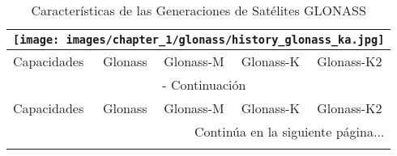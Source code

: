 \begin{center}
    \begin{longtable}{|p{3cm}|c|c|c|c|}
        \caption{Características de las Generaciones de Satélites GLONASS} \label{tab:glonass_satellites} \\
        \hline
        \multicolumn{5}{|c|}{
            \texttt{[image: images/chapter\_1/glonass/history\_glonass\_ka.jpg]}
        } \\
        \hline
        Capacidades & Glonass & Glonass-M & Glonass-K & Glonass-K2 \\
        \hline
        \endfirsthead
    
        \multicolumn{5}{c}{{\tablename\ \thetable{} - Continuación}} \\
        \hline
        Capacidades & Glonass & Glonass-M & Glonass-K & Glonass-K2 \\
        \hline
        \endhead
    
        \hline
        \multicolumn{5}{r}{{\fontsize{9}{11}\selectfont Continúa en la siguiente página...}} \\
        \endfoot
    
        \hline
        \endlastfoot
    

\end{longtable}
\end{center}
